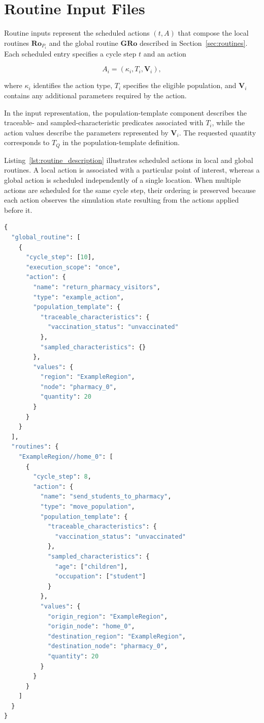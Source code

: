 \section{Routine Input Files}
\label{app:input_routine}

Routine inputs represent the scheduled actions $(t,A)$ that compose the local routines $\bm{Ro}_{P_i}$ and the global routine $\bm{GRo}$ described in Section~\ref{sec:routines}. Each scheduled entry specifies a cycle step $t$ and an action 

\[ A_i=(\kappa_i,T_i,\bm{V}_i), \] 

where $\kappa_i$ identifies the action type, $T_i$ specifies the eligible population, and $\bm{V}_i$ contains any additional parameters required by the action. 

In the input representation, the population-template component describes the traceable- and sampled-characteristic predicates associated with $T_i$, while the action values describe the parameters represented by $\bm{V}_i$. The requested quantity corresponds to $T_Q$ in the population-template definition. 

Listing~\ref{lst:routine_description} illustrates scheduled actions in local and global routines. A local action is associated with a particular point of interest, whereas a global action is scheduled independently of a single location. When multiple actions are scheduled for the same cycle step, their ordering is preserved because each action observes the simulation state resulting from the actions applied before it.

\begin{lstlisting}[language={Python},
caption={Example of ordered local and global routine inputs.},
captionpos=b, label={lst:routine_description}, basicstyle=\scriptsize]
{
  "global_routine": [
    {
      "cycle_step": [10],
      "execution_scope": "once",
      "action": {
        "name": "return_pharmacy_visitors",
        "type": "example_action",
        "population_template": {
          "traceable_characteristics": {
            "vaccination_status": "unvaccinated"
          },
          "sampled_characteristics": {}
        },
        "values": {
          "region": "ExampleRegion",
          "node": "pharmacy_0",
          "quantity": 20
        }
      }
    }
  ],
  "routines": {
    "ExampleRegion//home_0": [
      {
        "cycle_step": 8,
        "action": {
          "name": "send_students_to_pharmacy",
          "type": "move_population",
          "population_template": {
            "traceable_characteristics": {
              "vaccination_status": "unvaccinated"
            },
            "sampled_characteristics": {
              "age": ["children"],
              "occupation": ["student"]
            }
          },
          "values": {
            "origin_region": "ExampleRegion",
            "origin_node": "home_0",
            "destination_region": "ExampleRegion",
            "destination_node": "pharmacy_0",
            "quantity": 20
          }
        }
      }
    ]
  }
}
\end{lstlisting}



